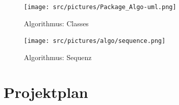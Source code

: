 \begin{appendix}
        \cleardoubleemptypage

        \begin{figure}[ht]
            \centering
            \texttt{[image: src/pictures/Package\_Algo-uml.png]}
            \caption{Algorithmus: Classes}
            \label{img:algo:classes}
        \end{figure}

        \cleardoubleemptypage

        \begin{figure}[ht]
            \centering
            \texttt{[image: src/pictures/algo/sequence.png]}
            \caption{Algorithmus: Sequenz}
            \label{img:algo:sequence}
        \end{figure}

    \chapter{Projektplan}

    
        \label{apx:projektplan}


\end{appendix}
